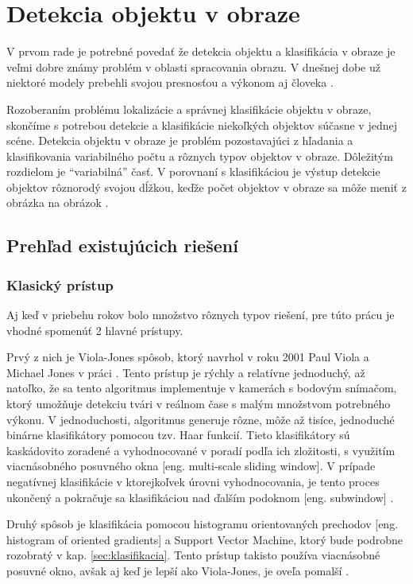 
\section{Detekcia objektu v obraze}
\label{sec:detekcia}

V prvom rade je potrebné povedať že detekcia objektu a klasifikácia v obraze je veľmi dobre známy problém v oblasti spracovania obrazu.
V dnešnej dobe už niektoré modely prebehli svojou presnosťou a výkonom aj človeka \cite{prop:NNvsHuman}.

Rozoberaním problému lokalizácie a správnej klasifikácie objektu v obraze, skončíme s potrebou
    detekcie a klasifikácie niekoľkých objektov súčasne v jednej scéne.
Detekcia objektu v obraze je problém pozostavajúci z hľadania a klasifikovania variabilného počtu a rôznych typov objektov v obraze.
Dôležitým rozdielom je ``variabilná'' časť. V porovnaní s klasifikáciou je výstup detekcie objektov rôznorodý svojou dĺžkou, keďže
    počet objektov v obraze sa môže meniť z obrázka na obrázok \cite{odkaz:ObjectDetectionOverview}.

\subsection{Prehľad existujúcich riešení}

\subsubsection{Klasický prístup}
Aj keď v priebehu rokov bolo množstvo rôznych typov riešení, pre túto prácu je vhodné spomenúť 2 hlavné prístupy.

Prvý z nich je Viola-Jones spôsob, ktorý navrhol v roku 2001 Paul Viola a Michael Jones v práci \cite{prop:Viola2001RobustRF}.
Tento prístup je rýchly a relatívne jednoduchý, až natoľko, že sa tento algoritmus implementuje v kamerách s bodovým snímačom, ktorý umožňuje
    detekciu tvári v reálnom čase s malým množstvom potrebného výkonu.
V jednoduchosti, algoritmus generuje rôzne, môže až tisíce, jednoduché binárne klasifikátory pomocou tzv. Haar funkcií.
Tieto klasifikátory sú kaskádovito zoradené a vyhodnocované v poradí podľa ich zložitosti, s využitím viacnásobného posuvného okna [eng. multi-scale sliding window].
V prípade negatívnej klasifikácie v ktorejkoľvek úrovni vyhodnocovania, je tento proces ukončený a pokračuje sa klasifikáciou nad ďalším podoknom [eng. subwindow] \cite{prop:Viola2001RobustRF}.

Druhý spôsob je klasifikácia pomocou histogramu orientovaných prechodov [eng. histogram of oriented gradients] a Support Vector Machine, ktorý bude podrobne
    rozobratý v kap. \ref{sec:klasifikacia}. Tento prístup takisto používa viacnásobné posuvné okno, avšak aj keď je lepší ako Viola-Jones, je oveľa pomalší \cite{odkaz:ObjectDetectionOverview}.

